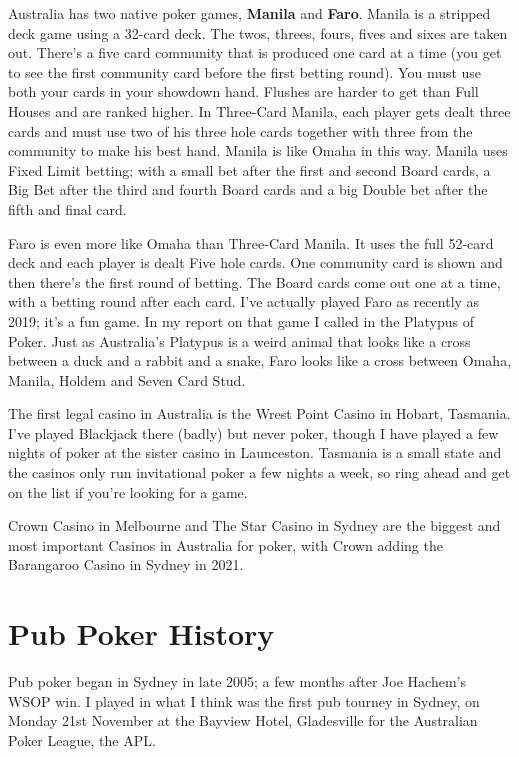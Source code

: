 Australia has two native poker games, \textbf{Manila} and
\textbf{Faro}. Manila is a stripped deck game using a 32-card
deck. The twos, threes, fours, fives and sixes are taken out.
There's a five card community that is produced one card at a time (you
get to see the first community card before the first betting round).
You must use both your cards in your showdown hand. Flushes are harder
to get than Full Houses and are ranked higher. In Three-Card Manila,
each player gets dealt three cards and must use two of his three hole
cards together with three from the community to make his best
hand. Manila is like Omaha in this way. Manila uses Fixed Limit
betting; with a small bet after the first and second Board cards, a
Big Bet after the third and fourth Board cards and a big Double bet
after the fifth and final card.

Faro is even more like Omaha than Three-Card Manila. It uses the full
52-card deck and each player is dealt Five hole cards. One community
card is shown and then there's the first round of betting. The Board
cards come out one at a time, with a betting round after each
card. I've actually played Faro as recently as 2019; it's a fun game.
In my report on that game I called in the Platypus of Poker. Just as
Australia's Platypus is a weird animal that looks like a cross between
a duck and a rabbit and a snake, Faro looks like a cross between
Omaha, Manila, Holdem and Seven Card Stud.

The first legal casino in Australia is the Wrest Point Casino in
Hobart, Tasmania. I've played Blackjack there (badly) but never poker,
though I have played a few nights of poker at the sister casino in
Launceston. Tasmania is a small state and the casinos only run
invitational poker a few nights a week, so ring ahead and get on the
list if you're looking for a game.

Crown Casino in Melbourne and The Star Casino in Sydney are the
biggest and most important Casinos in Australia for poker, with Crown
adding the Barangaroo Casino in Sydney in 2021.

\section{Pub Poker History}

Pub poker began in Sydney in late 2005; a few months after Joe
Hachem's WSOP win. I played in what I think was the first pub tourney
in Sydney, on Monday 21st November at the Bayview Hotel, Gladesville
for the Australian Poker League, the APL.

